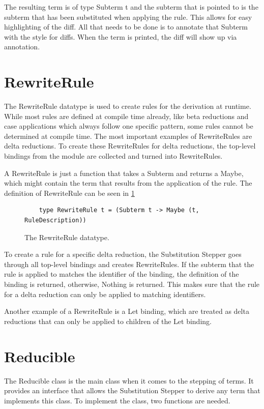 The resulting term is of type Subterm t
and the subterm that is pointed to
is the subterm that has been substituted when applying the rule.
This allows for easy highlighting of the diff.
All that needs to be done is to annotate that Subterm with the style for diffs.
When the term is printed, the diff will show up via annotation.

\section{RewriteRule}
The RewriteRule datatype is used to create rules for the derivation at runtime.
While most rules are defined at compile time already,
like beta reductions and case applications which always follow one specific pattern,
some rules cannot be determined at compile time.
The most important examples of RewriteRules are delta reductions.
To create these RewriteRules for delta reductions,
the top-level bindings from the module are collected and turned into RewriteRules.

A RewriteRule is just a function that takes a Subterm and returns a Maybe,
which might contain the term that results from the application of the rule.
The definition of RewriteRule can be seen in \ref*{fig:RewriteRule}

\begin{figure}[!ht]
    \begin{verbatim}
    type RewriteRule t = (Subterm t -> Maybe (t, RuleDescription))
    \end{verbatim}
    \caption{The RewriteRule datatype.}
    \label{fig:RewriteRule}
\end{figure}

To create a rule for a specific delta reduction,
the Substitution Stepper goes through all top-level bindings and creates RewriteRules.
If the subterm that the rule is applied to matches the identifier of the binding,
the definition of the binding is returned,
otherwise, Nothing is returned.
This makes sure that the rule for a delta reduction can only be applied to matching identifiers.

Another example of a RewriteRule is a Let binding,
which are treated as delta reductions that can only be applied to children of the Let binding.

\section{Reducible}
The Reducible class is the main class when it comes to the stepping of terms.
It provides an interface that allows the Substitution Stepper to derive any term that implements this class.
To implement the class, two functions are needed.

